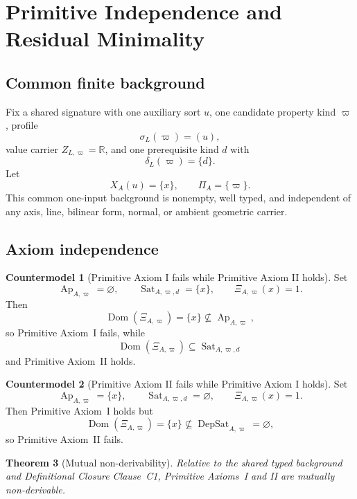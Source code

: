 \documentclass[11pt]{article}
\newcommand{\Ap}{\operatorname{Ap}}
\newcommand{\DepSat}{\operatorname{DepSat}}
\newcommand{\Sat}{\operatorname{Sat}}
\newcommand{\Dom}{\operatorname{Dom}}
\newtheorem{theorem}{Theorem}[section]
\theoremstyle{definition}
\newtheorem{countermodel}[theorem]{Countermodel}
\theoremstyle{remark}
\begin{document}
\section{Primitive Independence and Residual Minimality}
\label{sec:independence}

\subsection{Common finite background}

Fix a shared signature with one auxiliary sort \(u\), one candidate property kind \(\varpi\), profile
\[
\sigma_L(\varpi)=(u),
\]
value carrier \(Z_{L,\varpi}=\mathbb R\), and one prerequisite kind \(d\) with
\[
\delta_L(\varpi)=\{d\}.
\]
Let
\[
X_A(u)=\{x\},
\qquad
\Pi_A=\{\varpi\}.
\]
This common one-input background is nonempty, well typed, and independent of any axis, line, bilinear form, normal, or ambient geometric carrier.

\subsection{Axiom independence}

\begin{countermodel}[Primitive Axiom I fails while Primitive Axiom II holds]
\label{cm:pi}
Set
\[
\Ap_{A,\varpi}=\varnothing,
\qquad
\Sat_{A,\varpi,d}=\{x\},
\qquad
\Xi_{A,\varpi}(x)=1.
\]
Then
\[
\Dom(\Xi_{A,\varpi})=\{x\}\not\subseteq\Ap_{A,\varpi},
\]
so Primitive Axiom~I fails, while
\[
\Dom(\Xi_{A,\varpi})\subseteq\Sat_{A,\varpi,d}
\]
and Primitive Axiom~II holds.
\end{countermodel}

\begin{countermodel}[Primitive Axiom II fails while Primitive Axiom I holds]
\label{cm:pii}
Set
\[
\Ap_{A,\varpi}=\{x\},
\qquad
\Sat_{A,\varpi,d}=\varnothing,
\qquad
\Xi_{A,\varpi}(x)=1.
\]
Then Primitive Axiom~I holds but
\[
\Dom(\Xi_{A,\varpi})=\{x\}\not\subseteq\DepSat_{A,\varpi}=\varnothing,
\]
so Primitive Axiom~II fails.
\end{countermodel}

\begin{theorem}[Mutual non-derivability]
\label{thm:independence}
Relative to the shared typed background and Definitional Closure Clause~C1, Primitive Axioms~I and II are mutually non-derivable.
\end{theorem}
\end{document}
